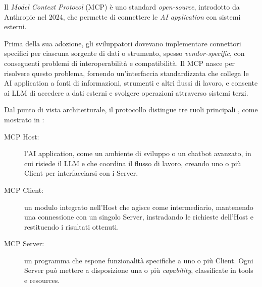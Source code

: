 Il \emph{Model Context Protocol} (MCP) \cite{anthropic2024mcp} è uno standard \emph{open-source}, introdotto da Anthropic nel 2024, che permette di connettere le \emph{AI application} con sistemi esterni.

Prima della sua adozione, gli sviluppatori dovevano implementare connettori specifici per ciascuna sorgente di dati o strumento, spesso \emph{vendor-specific}, con conseguenti problemi di interoperabilità e compatibilità. Il MCP nasce per risolvere questo problema, fornendo un'interfaccia standardizzata che collega le AI application a fonti di informazioni, strumenti e altri flussi di lavoro, e consente ai LLM di accedere a dati esterni e svolgere operazioni attraverso sistemi terzi.



Dal punto di vista architetturale, il protocollo distingue tre ruoli principali \cite{anthropic2024mcp}, come mostrato in :

\begin{description}
    \item[MCP Host:] l'AI application, come un ambiente di sviluppo o un chatbot avanzato, in cui risiede il LLM e che coordina il flusso di lavoro, creando uno o più Client per interfacciarsi con i Server.

    \item[MCP Client:] un modulo integrato nell'Host che agisce come intermediario, mantenendo una connessione con un singolo Server, instradando le richieste dell'Host e restituendo i risultati ottenuti. %

    \item[MCP Server:] un programma che espone funzionalità specifiche a uno o più Client. Ogni Server può mettere a disposizione una o più \emph{capability}, classificate in tools e resources.
\end{description}

